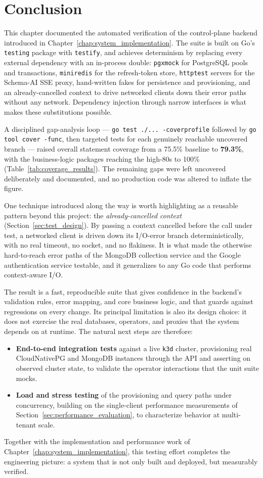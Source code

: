 \section{Conclusion}
\label{sec:testing_conclusion}

This chapter documented the automated verification of the control-plane backend introduced in Chapter~\ref{chap:system_implementation}. The suite is built on Go's \texttt{testing} package with \texttt{testify}, and achieves determinism by replacing every external dependency with an in-process double: \texttt{pgxmock} for PostgreSQL pools and transactions, \texttt{miniredis} for the refresh-token store, \texttt{httptest} servers for the Schema-AI SSE proxy, hand-written fakes for persistence and provisioning, and an already-cancelled context to drive networked clients down their error paths without any network. Dependency injection through narrow interfaces is what makes these substitutions possible.

A disciplined gap-analysis loop --- \texttt{go test ./... -coverprofile} followed by \texttt{go tool cover -func}, then targeted tests for each genuinely reachable uncovered branch --- raised overall statement coverage from a 75.5\% baseline to \textbf{79.3\%}, with the business-logic packages reaching the high-80s to 100\% (Table~\ref{tab:coverage_results}). The remaining gaps were left uncovered deliberately and documented, and no production code was altered to inflate the figure.

One technique introduced along the way is worth highlighting as a reusable pattern beyond this project: the \emph{already-cancelled context} (Section~\ref{sec:test_design}). By passing a context cancelled before the call under test, a networked client is driven down its I/O-error branch deterministically, with no real timeout, no socket, and no flakiness. It is what made the otherwise hard-to-reach error paths of the MongoDB collection service and the Google authentication service testable, and it generalizes to any Go code that performs context-aware I/O.

The result is a fast, reproducible suite that gives confidence in the backend's validation rules, error mapping, and core business logic, and that guards against regressions on every change. Its principal limitation is also its design choice: it does not exercise the real databases, operators, and proxies that the system depends on at runtime. The natural next steps are therefore:

\begin{itemize}
    \item \textbf{End-to-end integration tests} against a live \texttt{k3d} cluster, provisioning real CloudNativePG and MongoDB instances through the API and asserting on observed cluster state, to validate the operator interactions that the unit suite mocks.
    \item \textbf{Load and stress testing} of the provisioning and query paths under concurrency, building on the single-client performance measurements of Section~\ref{sec:performance_evaluation}, to characterize behavior at multi-tenant scale.
\end{itemize}

Together with the implementation and performance work of Chapter~\ref{chap:system_implementation}, this testing effort completes the engineering picture: a system that is not only built and deployed, but measurably verified.
